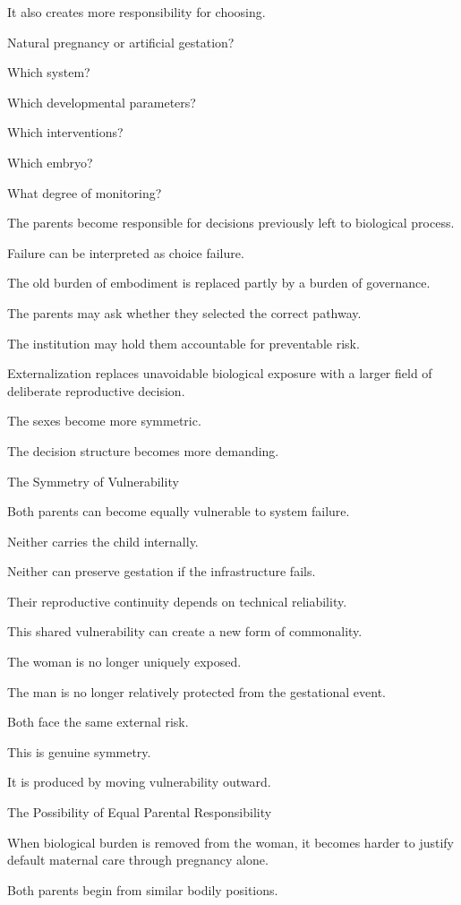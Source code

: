 It also creates more responsibility for choosing.

Natural pregnancy or artificial gestation?

Which system?

Which developmental parameters?

Which interventions?

Which embryo?

What degree of monitoring?

The parents become responsible for decisions previously left to biological process.

Failure can be interpreted as choice failure.

The old burden of embodiment is replaced partly by a burden of governance.

The parents may ask whether they selected the correct pathway.

The institution may hold them accountable for preventable risk.

Externalization replaces unavoidable biological exposure with a larger field of deliberate reproductive decision.

The sexes become more symmetric.

The decision structure becomes more demanding.

The Symmetry of Vulnerability

Both parents can become equally vulnerable to system failure.

Neither carries the child internally.

Neither can preserve gestation if the infrastructure fails.

Their reproductive continuity depends on technical reliability.

This shared vulnerability can create a new form of commonality.

The woman is no longer uniquely exposed.

The man is no longer relatively protected from the gestational event.

Both face the same external risk.

This is genuine symmetry.

It is produced by moving vulnerability outward.

The Possibility of Equal Parental Responsibility

When biological burden is removed from the woman, it becomes harder to justify default maternal care through pregnancy alone.

Both parents begin from similar bodily positions.


